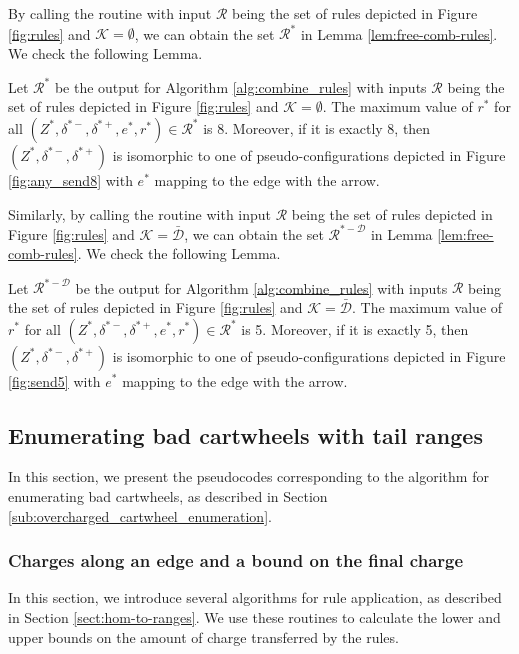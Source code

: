 \documentclass[main.tex]{subfiles}
\begin{document}
By calling the \combineRules routine with input $\mathcal{R}$ being the set of rules depicted in Figure \ref{fig:rules} and $\mathcal{K}=\emptyset$, we can obtain the set $\mathcal{R}^*$ in Lemma \ref{lem:free-comb-rules}.
We check the following Lemma.

\begin{lem}
\label{comp:vsends-noconf}
    Let $\mathcal{R}^*$ be the output for Algorithm \ref{alg:combine_rules} with inputs $\mathcal{R}$ being the set of rules depicted in Figure \ref{fig:rules} and $\mathcal{K}=\emptyset$.
    The maximum value of $r^*$ for all $(Z^*, \delta^{*-}, \delta^{*+}, e^*, r^*) \in \mathcal{R}^*$ is 8.
    Moreover, if it is exactly 8, then $(Z^*, \delta^{*-}, \delta^{*+})$ is isomorphic to one of pseudo-configurations depicted in Figure \ref{fig:any_send8} with $e^*$ mapping to the edge with the arrow.
\end{lem}

Similarly, by calling the \combineRules routine with input $\mathcal{R}$ being the set of rules depicted in Figure \ref{fig:rules} and $\mathcal{K}=\bar{\mathcal{D}}$, we can obtain the set $\mathcal{R}^{*-\mathcal{D}}$ in Lemma \ref{lem:free-comb-rules}.
We check the following Lemma.

\begin{lem}
\label{comp:vsends}
    Let $\mathcal{R}^{*-\mathcal{D}}$ be the output for Algorithm \ref{alg:combine_rules} with inputs $\mathcal{R}$ being the set of rules depicted in Figure \ref{fig:rules} and $\mathcal{K}=\bar{\mathcal{D}}$.
    The maximum value of $r^*$ for all $(Z^*, \delta^{*-}, \delta^{*+}, e^*, r^*) \in \mathcal{R}^*$ is 5.
    Moreover, if it is exactly 5, then $(Z^*, \delta^{*-}, \delta^{*+})$ is isomorphic to one of pseudo-configurations depicted in Figure \ref{fig:send5} with $e^*$ mapping to the edge with the arrow.
\end{lem}


\subsection{Enumerating bad cartwheels with tail ranges}
In this section, we present the pseudocodes corresponding to the algorithm for enumerating bad cartwheels, as described in Section \ref{sub:overcharged_cartwheel_enumeration}.


\subsubsection{Charges along an edge and a bound on the final charge}
In this section, we introduce several algorithms for rule application, as described in Section \ref{sect:hom-to-ranges}.
We use these routines to calculate the lower and upper bounds on the amount of charge transferred by the rules.
\end{document}
